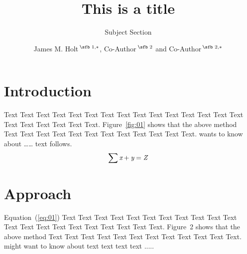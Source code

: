 \documentclass{bioinfo}
\begin{document}

\subtitle{Subject Section}

\title[short Title]{This is a title}
\author[Holt \textit{et~al}.]{James M. Holt\,$^{\text{\sfb 1,}*}$, Co-Author\,$^{\text{\sfb 2}}$ and Co-Author\,$^{\text{\sfb 2,}*}$}
\address{$^{\text{\sf 1}}$Department, Institution, City, Post Code, Country and \\
$^{\text{\sf 2}}$Department, Institution, City, Post Code,
Country.}





\maketitle

\section{Introduction}

Text Text Text Text Text Text  Text Text Text Text Text Text Text
Text Text  Text Text Text Text Text Text. Figure~\ref{fig:01}
shows that the above method  Text Text Text Text  Text Text Text
Text Text Text  Text Text.  \citep{Bag01} wants to know about
{\ldots}{\ldots} text follows.
\begin{equation}
\sum \text{\it x}+ \text{\it y} =\text{\it Z}\label{eq:01}\vspace*{-10pt}
\end{equation}


\section{Approach}

Equation~(\ref{eq:01}) Text Text Text Text Text Text  Text Text
Text Text Text Text Text Text Text Text Text Text Text Text Text.
Figure~2\vphantom{\ref{fig:02}} shows that the above method  Text
Text Text Text  Text Text Text Text Text Text  Text Text.
\citealp{Boffelli03} might want to know about text text text text
.....
\end{document}
